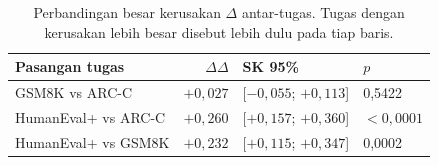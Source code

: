 \begin{table}[htbp]
\centering
\caption{Perbandingan besar kerusakan $\Delta$ antar-tugas. Tugas dengan kerusakan lebih besar disebut lebih dulu pada tiap baris.}
\label{tab:disosiasi}
\begin{tabular}{lrll}
\hline
Pasangan tugas & $\Delta\Delta$ & SK 95\% & $p$ \\
\hline
GSM8K vs ARC-C & $+0{,}027$ & [$-0{,}055$; $+0{,}113$] & 0,5422 \\
HumanEval+ vs ARC-C & $+0{,}260$ & [$+0{,}157$; $+0{,}360$] & $<0{,}0001$ \\
HumanEval+ vs GSM8K & $+0{,}232$ & [$+0{,}115$; $+0{,}347$] & 0,0002 \\
\hline
\end{tabular}
\end{table}
